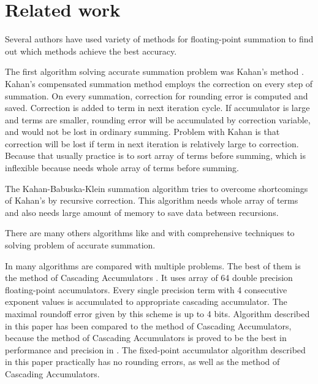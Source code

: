 \documentclass[conference]{IEEEtran}
\begin{document}
\section{Related work}
Several authors have used variety of methods for floating-point 
summation to find out which methods achieve the best accuracy. 
\par
The first algorithm solving accurate summation problem was Kahan's method \cite{Kahan}. 
Kahan's compensated summation method employs the correction 
on every step of summation. 
On every summation, correction for rounding error is computed and saved.
Correction is added to term in next iteration cycle.
If accumulator is large and terms are smaller, rounding error will be accumulated by correction variable, 
and would not be lost in ordinary summing.
Problem with Kahan is that correction will be lost if term in next iteration is relatively large to correction.
Because that usually practice is to sort array of terms before summing, 
which is inflexible because needs whole array of terms before summing.
\par
The Kahan-Babuska-Klein summation algorithm \cite{KahanBabuskaKlein} tries to overcome shortcomings of Kahan's by recursive correction.
This algorithm needs whole array of terms and also needs large amount of memory to save data between recursions.
\par
There are many others algorithms like \cite{DemmelAndHida} and \cite{DistillationAlgo} with comprehensive techniques 
to solving problem of accurate summation.
\par
In \cite{ComparisonOfMethods} many algorithms are compared with multiple problems.
The best of them is the method of Cascading Accumulators \cite{CascadingAccumulators}.
It uses array of 64 double precision floating-point accumulators.
Every single precision term with 4 consecutive exponent values is accumulated to appropriate cascading accumulator.
The maximal roundoff error given by this scheme is up to 4 bits.
Algorithm described in this paper has been compared to the method of Cascading Accumulators,
because the method of Cascading Accumulators is proved 
to be the best in performance and precision in \cite{ComparisonOfMethods}.
The fixed-point accumulator algorithm described in this paper practically has no rounding errors,
as well as the method of Cascading Accumulators.
\end{document}
